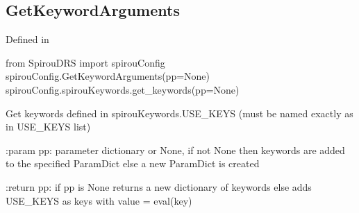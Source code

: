 \begin{minipage}{\textwidth}
\subsection{GetKeywordArguments}

Defined in \spirouConfig{}

\begin{pythonbox}
from SpirouDRS import spirouConfig
spirouConfig.GetKeywordArguments(pp=None)
spirouConfig.spirouKeywords.get_keywords(pp=None)
\end{pythonbox}

\begin{pythondocstring}
Get keywords defined in spirouKeywords.USE_KEYS 
(must be named exactly as in USE_KEYS list)

:param pp: parameter dictionary or None, if not None then keywords are added
           to the specified ParamDict else a new ParamDict is created

:return pp: if pp is None returns a new dictionary of keywords
            else adds USE_KEYS as keys with value = eval(key)
\end{pythondocstring}
\end{minipage}

